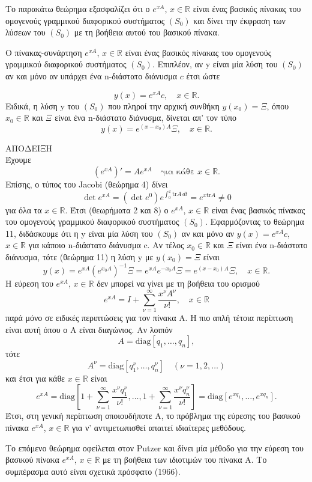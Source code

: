 \documentclass[11pt,a4paper,twoside]{book}
\newcommand{\titlefont}[1]{{\fontfamily{maksf}\selectfont #1}}
\newcounter{thewrhma}[chapter]
\renewcommand{\thethewrhma}{\thechapter.\arabic{thewrhma}}
\newcommand{\thewr}{\refstepcounter{thewrhma}{\bf\titlefont{\textcolor{secondarycolor}{\large Θεώρημα\hspace{2mm}\thethewrhma}}}\hspace{1mm}}{}
\newenvironment{Thewrhma}[1]
{\begin{tcolorbox}[title=\thewr\ \ :\ \  {\textcolor{black}{\bf{\large\titlefont{#1}}}},
breakable,
enhanced standard,
titlerule=-.2pt,
toprule=0pt, 
rightrule=0pt, 
bottomrule=0pt,
colback=white,
left=2mm,
top=1mm,
bottom=0mm,
boxrule=0pt,
colframe=white,
borderline west={1.5mm}{0pt}{secondarycolor},
leftrule=2mm,
sharp corners,
coltitle=secondarycolor]}
{\end{tcolorbox}}
\newcommand{\eng}[1]{\selectlanguage{english}#1\selectlanguage{greek}}
\begin{document}
Το παρακάτω θεώρημα εξασφαλίζει ότι ο $e^{xA}$, $x \in \mathbb{R}$ είναι ένας βασικός πίνακας του ομογενούς γραμμικού διαφορικού συστήματος $(S_0)$ και δίνει την έκφραση των λύσεων του $(S_0)$ με τη βοήθεια αυτού του βασικού πίνακα.
\begin{Thewrhma}{16}
Ο πίνακας-συνάρτηση $e^{xA}$, $x \in \mathbb{R}$ είναι ένας βασικός πίνακας του ομογενούς γραμμικού διαφορικού συστήματος $(S_0)$. Επιπλέον, αν y είναι μία λύση του $(S_0)$ αν και μόνο αν υπάρχει ένα n-διάστατο διάνυσμα $c$ έτσι ώστε

\[
y(x) = e^{xA}c, \quad x \in \mathbb{R}.
\]
Ειδικά, η λύση y του $(S_0)$ που πληροί την αρχική συνθήκη $y(x_0) = \Xi$, όπου $x_0 \in \mathbb{R}$ και $\Xi$ είναι ένα n-διάστατο διάνυσμα, δίνεται απ' τον τύπο
\[
y(x) = e^{(x-x_0)A}\Xi, \quad x \in \mathbb{R}.
\]
\end{Thewrhma}
ΑΠΟΔΕΙΞΗ\\
Έχουμε
\[
(e^{xA})' = Ae^{xA} \quad \text{για κάθε } x \in \mathbb{R}.
\]
Επίσης, ο τύπος του Jacobi (θεώρημα 4) δίνει
\[
\det e^{xA} = (\det e^0) e^{\int_0^x \text{tr}A \, dt} = e^{x\text{tr}A} \neq 0
\]
για όλα τα $x \in \mathbb{R}$. Έτσι (θεωρήματα 2 και 8) ο $e^{xA}$, $x \in \mathbb{R}$ είναι ένας βασικός πίνακας του ομογενούς γραμμικού διαφορικού συστήματος $(S_0)$. Εφαρμόζοντας το θεώρημα 11, διδάσκουμε ότι η y είναι μία λύση του $(S_0)$ αν και μόνο αν $y(x) = e^{xA}c$, $x \in \mathbb{R}$ για κάποιο n-διάστατο διάνυσμα c. Αν τέλος $x_0 \in \mathbb{R}$ και $\Xi$ είναι ένα n-διάστατο διάνυσμα, τότε (θεώρημα 11) η λύση y με $y(x_0) = \Xi$ είναι
\[
y(x) = e^{xA}(e^{x_0A})^{-1}\Xi = e^{xA}e^{-x_0A}\Xi = e^{(x-x_0)A}\Xi, \quad x \in \mathbb{R}.
\]
Η εύρεση του $e^{xA}$, $x \in \mathbb{R}$ δεν μπορεί να γίνει με τη βοήθεια του ορισμού
\[
e^{xA} = I + \sum_{\nu=1}^{\infty} \frac{x^\nu A^\nu}{\nu!}, \quad x \in \mathbb{R}
\]
παρά μόνο σε ειδικές περιπτώσεις για τον πίνακα Α. Η πιο απλή τέτοια περίπτωση είναι αυτή όπου ο Α είναι διαγώνιος. Αν λοιπόν
\[
A = \text{diag}[q_1, \dots, q_n],
\]
τότε
\[
A^\nu = \text{diag}[q_1^\nu, \dots, q_n^\nu] \quad (\nu=1,2,\dots)
\]
και έτσι για κάθε $x \in \mathbb{R}$ είναι
\[
e^{xA} = \text{diag}\left[1+\sum_{\nu=1}^{\infty}\frac{x^\nu q_1^\nu}{\nu!}, \dots, 1+\sum_{\nu=1}^{\infty}\frac{x^\nu q_n^\nu}{\nu!}\right] = \text{diag}[e^{xq_1}, \dots, e^{xq_n}].
\]
Έτσι, στη γενική περίπτωση οποιουδήποτε Α, το πρόβλημα της εύρεσης του βασικού πίνακα $e^{xA}$, $x \in \mathbb{R}$ για ν' αντιμετωπισθεί απαιτεί ιδιαίτερες μεθόδους.

Το επόμενο θεώρημα οφείλεται στον \eng{Putzer} και δίνει μία μέθοδο για την εύρεση του βασικού πίνακα $e^{xA}$, $x \in \mathbb{R}$ με τη βοήθεια των ιδιοτιμών του πίνακα Α. Το συμπέρασμα αυτό είναι σχετικά πρόσφατο (1966).
\end{document}
